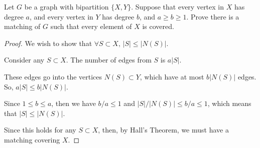 \documentclass[../hw6]{subfiles}
\begin{document}
\begin{problem}
Let $G$ be a graph with bipartition $\{X,Y\}$. Suppose that every vertex in $X$ has degree $a$, and every vertex in $Y$ has degree $b$, and $a \ge b \ge 1$. Prove there is a matching of $G$ such that every element of $X$ is covered.
\end{problem}
\begin{proof}
	We wish to show that $\forall S\subset X,\, |S| \le |N(S)|$.

  Consider any $S\subset X$. 
  The number of edges from $S$ is  $a|S| $. 

  These edges go into the vertices $N(S)\subset Y$, which have at most $b|N(S)|$ edges. 
  So, $a|S| \le b|N(S)|$. 

	Since $1\le b\le a$, then we have $b / a \le 1$ and $|S| / |N(S)| \le b / a \le 1$, 
  which means that $|S| \le |N(S)|$.

  Since this holds for any $S\subset X$, then, by Hall's Theorem, we must have a matching covering $X$. 
\end{proof}
\end{document}

